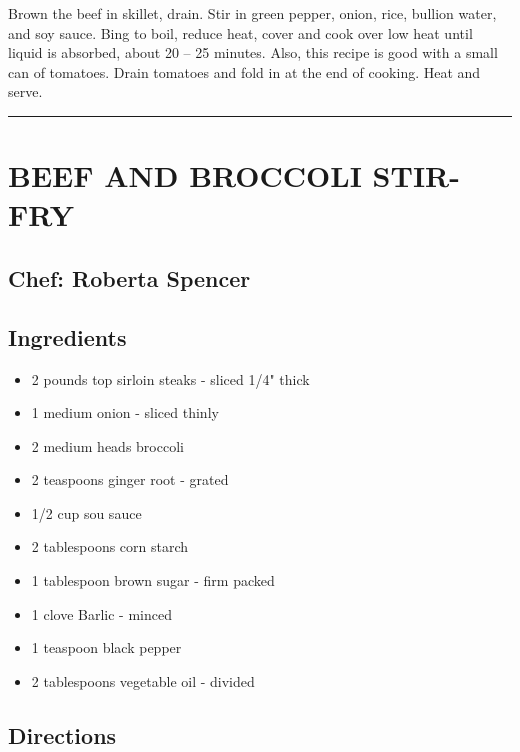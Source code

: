 \documentclass[
]{book}
\providecommand{\tightlist}{%
  \setlength{\itemsep}{0pt}\setlength{\parskip}{0pt}}
\begin{document}
Brown the beef in skillet, drain. Stir in green pepper, onion, rice, bullion water,
and soy sauce. Bing to boil, reduce heat, cover and cook over low heat until
liquid is absorbed, about 20 -- 25 minutes. Also, this recipe is good with a small can of
tomatoes. Drain tomatoes and fold in at the end of cooking. Heat and serve.

\begin{center}\rule{0.5\linewidth}{0.5pt}\end{center}

\hypertarget{beef-and-broccoli-stir-fry}{%
\section*{BEEF AND BROCCOLI STIR-FRY}\label{beef-and-broccoli-stir-fry}}


\hypertarget{chef-roberta-spencer-15}{%
\subsection*{Chef: Roberta Spencer}\label{chef-roberta-spencer-15}}


\hypertarget{ingredients-44}{%
\subsection*{Ingredients}\label{ingredients-44}}


\begin{itemize}
\tightlist
\item
  2 pounds top sirloin steaks - sliced 1/4" thick
\item
  1 medium onion - sliced thinly
\item
  2 medium heads broccoli
\item
  2 teaspoons ginger root - grated
\item
  1/2 cup sou sauce
\item
  2 tablespoons corn starch
\item
  1 tablespoon brown sugar - firm packed
\item
  1 clove Barlic - minced
\item
  1 teaspoon black pepper
\item
  2 tablespoons vegetable oil - divided
\end{itemize}

\hypertarget{directions-44}{%
\subsection*{Directions}\label{directions-44}}
\end{document}
